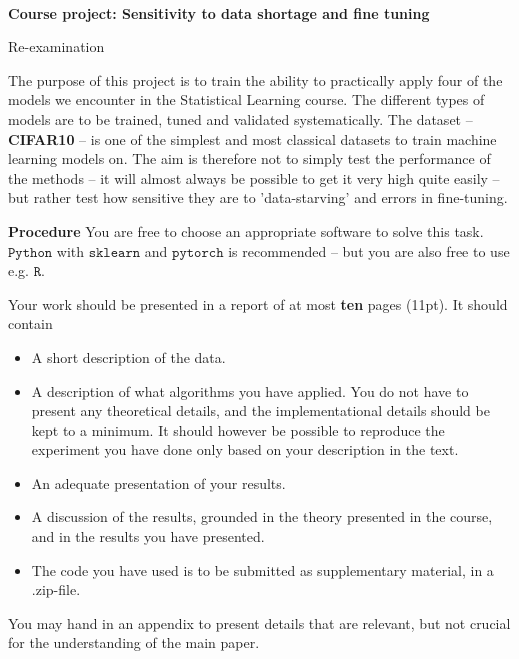 \documentclass{article}
\begin{document}
\renewcommand{\headrulewidth}{0.4pt}
\renewcommand{\footrulewidth}{0.0pt}

\thispagestyle{fancy}
\fancyhf{}


\

{ \bf \center \large Course project: Sensitivity to data shortage and fine tuning}

{\large Re-examination}

\smallskip

The purpose of this project is to train the ability to practically apply four of the models we encounter in the Statistical Learning course. The different types of models are to be trained, tuned and validated systematically. The dataset -- \textbf{CIFAR10} -- is one of the simplest and most classical datasets to train machine learning models on. The aim is therefore not to simply test the performance of the methods -- it will almost always be possible to get it very high quite easily -- but rather test how sensitive they are to 'data-starving' and errors in fine-tuning.  \newline


\textbf{Procedure} You are free to choose an appropriate software to solve this task. $\texttt{Python}$ with $\texttt{sklearn}$ and $\texttt{pytorch}$ is recommended -- but you are also free to use e.g. $\texttt{R}$.

Your work should be presented in a report of at most \textbf{ten} pages (11pt). It should contain
\begin{itemize}
    \item A short description of the data.
    \item A description of what algorithms you have applied. You do not have to present any theoretical details, and the implementational details should be kept to a minimum. It should however be possible to reproduce the experiment you have done only based on your description in the text.
    \item An adequate presentation of your results.
    \item A discussion of the results, grounded in the theory presented in the course, and in the results you have presented.
    \item The code you have used is to be submitted as supplementary material, in a .zip-file.
\end{itemize}
You may hand in an appendix to present details that are relevant, but not crucial for the understanding of the main paper.
\end{document}

